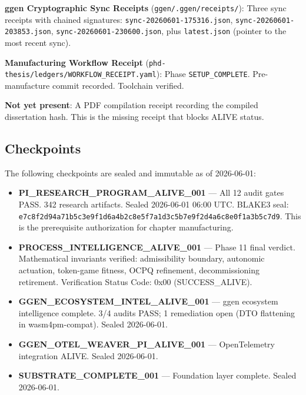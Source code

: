 \textbf{ggen Cryptographic Sync Receipts} (\texttt{ggen/.ggen/receipts/}):
Three sync receipts with chained signatures:
\texttt{sync-20260601-175316.json},
\texttt{sync-20260601-203853.json},
\texttt{sync-20260601-230600.json},
plus \texttt{latest.json} (pointer to the most recent sync).

\textbf{Manufacturing Workflow Receipt} (\texttt{phd-thesis/ledgers/WORKFLOW\_RECEIPT.yaml}):
Phase \texttt{SETUP\_COMPLETE}. Pre-manufacture commit recorded. Toolchain verified.

\textbf{Not yet present}: A PDF compilation receipt recording the compiled dissertation hash.
This is the missing receipt that blocks ALIVE status.

\subsection{Checkpoints}
\label{sec:phd-thesis-evidence-checkpoints}

The following checkpoints are sealed and immutable as of 2026-06-01:

\begin{itemize}
  \item \textbf{PI\_RESEARCH\_PROGRAM\_ALIVE\_001} --- All 12 audit gates PASS.
    342 research artifacts. Sealed 2026-06-01 06:00 UTC.
    BLAKE3 seal: \texttt{e7c8f2d94a71b5c3e9f1d6a4b2c8e5f7a1d3c5b7e9f2d4a6c8e0f1a3b5c7d9}.
    This is the prerequisite authorization for chapter manufacturing.

  \item \textbf{PROCESS\_INTELLIGENCE\_ALIVE\_001} --- Phase 11 final verdict.
    Mathematical invariants verified: admissibility boundary, autonomic actuation,
    token-game fitness, OCPQ refinement, decommissioning retirement.
    Verification Status Code: 0x00 (SUCCESS\_ALIVE).

  \item \textbf{GGEN\_ECOSYSTEM\_INTEL\_ALIVE\_001} --- ggen ecosystem intelligence
    complete. 3/4 audits PASS; 1 remediation open (DTO flattening in wasm4pm-compat).
    Sealed 2026-06-01.

  \item \textbf{GGEN\_OTEL\_WEAVER\_PI\_ALIVE\_001} --- OpenTelemetry integration ALIVE.
    Sealed 2026-06-01.

  \item \textbf{SUBSTRATE\_COMPLETE\_001} --- Foundation layer complete.
    Sealed 2026-06-01.
\end{itemize}

